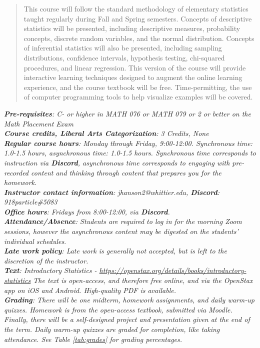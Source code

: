 \documentclass[10pt]{article}
\begin{document}
\maketitle

\begin{abstract}
This course will follow the standard methodology of elementary statistics taught regularly during Fall and Spring semesters. Concepts of descriptive statistics will be presented, including descriptive measures, probability concepts, discrete random variables, and the normal distribution. Concepts of inferential statistics will also be presented, including sampling distributions, confidence intervals, hypothesis testing, chi-squared procedures, and linear regression. This version of the course will provide interactive learning techniques designed to augment the online learning experience, and the course textbook will be free.  Time-permitting, the use of computer programming tools to help visualize examples will be covered.
\end{abstract}
\noindent
\textit{\textbf{Pre-requisites}: C- or higher in MATH 076 or MATH 079 or 2 or better on the Math Placement Exam } \\
\textit{\textbf{Course credits, Liberal Arts Categorization}: 3 Credits, None} \\
\textit{\textbf{Regular course hours}: Monday through Friday, 9:00-12:00.  Synchronous time: 1.0-1.5 hours, asynchronous time: 1.0-1.5 hours.  Synchronous time corresponds to instruction via \textbf{Discord}, asynchronous time corresponds to engaging with pre-recorded content and thinking through content that prepares you for the homework.} \\
\textit{\textbf{Instructor contact information}: jhanson2@whittier.edu, \textbf{Discord}: 918particle\#5083} \\
\textit{\textbf{Office hours}: Fridays from 8:00-12:00, via \textbf{Discord}.} \\
\textit{\textbf{Attendance/Absence}: Students are required to log in for the morning Zoom sessions, however the asynchronous content may be digested on the students' individual schedules}.\\ 
\textit{\textbf{Late work policy}: Late work is generally not accepted, but is left to the discretion of the instructor.} \\
\textit{\textbf{Text}: Introductory Statistics - \url{https://openstax.org/details/books/introductory-statistics} The text is open-access, and therefore free online, and via the OpenStax app on iOS and Android.  High-quality PDF is available.} \\
\textit{\textbf{Grading}: There will be one midterm, homework assignments, and daily warm-up quizzes.  Homework is from the open-access textbook, submitted via Moodle.  Finally, there will be a self-designed project and presentation given at the end of the term.  Daily warm-up quizzes are graded for completion, like taking attendance. See Table \ref{tab:grades} for grading percentages.} \\
\end{document}
